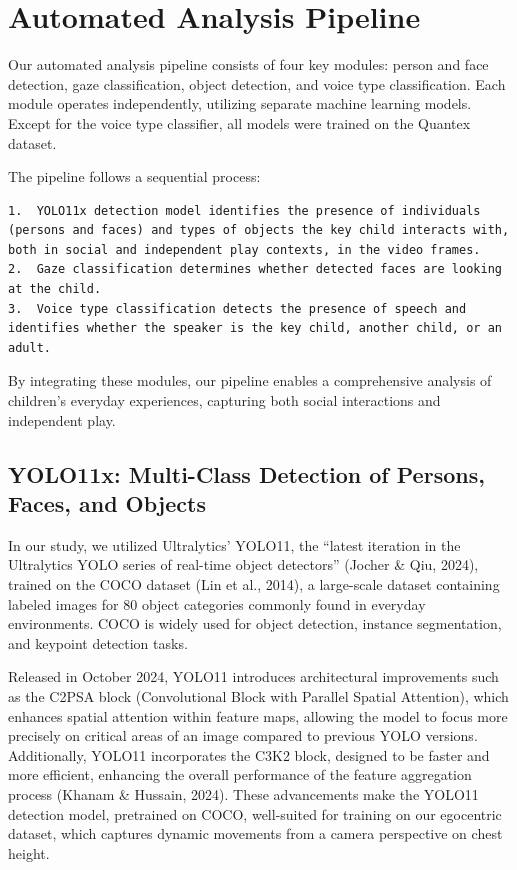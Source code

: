 \documentclass[
  man,floatsintext]{apa6}
\begin{document}
\section{Automated Analysis Pipeline}\label{sup-automatic-analysis}

Our automated analysis pipeline consists of four key modules: person and face detection, gaze classification, object detection, and voice type classification. Each module operates independently, utilizing separate machine learning models. Except for the voice type classifier, all models were trained on the Quantex dataset.

The pipeline follows a sequential process:

\begin{verbatim}
1.  YOLO11x detection model identifies the presence of individuals (persons and faces) and types of objects the key child interacts with, both in social and independent play contexts, in the video frames.
2.  Gaze classification determines whether detected faces are looking at the child.
3.  Voice type classification detects the presence of speech and identifies whether the speaker is the key child, another child, or an adult.
\end{verbatim}

By integrating these modules, our pipeline enables a comprehensive analysis of children's everyday experiences, capturing both social interactions and independent play.

\subsection{YOLO11x: Multi-Class Detection of Persons, Faces, and Objects}\label{sup-yolo11x}

In our study, we utilized Ultralytics' YOLO11, the ``latest iteration in the Ultralytics YOLO series of real-time object detectors'' (Jocher \& Qiu, 2024), trained on the COCO dataset (Lin et al., 2014), a large-scale dataset containing labeled images for 80 object categories commonly found in everyday environments. COCO is widely used for object detection, instance segmentation, and keypoint detection tasks.

Released in October 2024, YOLO11 introduces architectural improvements such as the C2PSA block (Convolutional Block with Parallel Spatial Attention), which enhances spatial attention within feature maps, allowing the model to focus more precisely on critical areas of an image compared to previous YOLO versions. Additionally, YOLO11 incorporates the C3K2 block, designed to be faster and more efficient, enhancing the overall performance of the feature aggregation process (Khanam \& Hussain, 2024). These advancements make the YOLO11 detection model, pretrained on COCO, well-suited for training on our egocentric dataset, which captures dynamic movements from a camera perspective on chest height.
\end{document}
